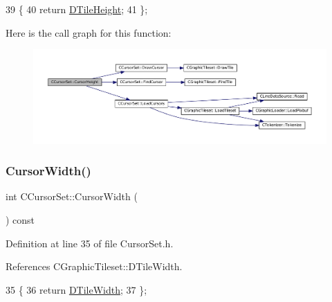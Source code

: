 \begin{DoxyCode}
39                                 \{
40             \textcolor{keywordflow}{return} \hyperlink{classCGraphicTileset_af48f32e07d5fe69afd5f764318cc3244}{DTileHeight};
41         \};
\end{DoxyCode}
Here is the call graph for this function\+:\nopagebreak
\begin{figure}[H]
\begin{center}
\leavevmode
\includegraphics[width=350pt]{classCCursorSet_a25ce1f3e861c3d4ea701bb2e810728a6_cgraph}
\end{center}
\end{figure}
\hypertarget{classCCursorSet_a6984a5bfd8b989c09f9ab8aac459993e}{}\label{classCCursorSet_a6984a5bfd8b989c09f9ab8aac459993e} 
\subsubsection{\texorpdfstring{Cursor\+Width()}{CursorWidth()}}
{\footnotesize\ttfamily int C\+Cursor\+Set\+::\+Cursor\+Width (\begin{DoxyParamCaption}{ }\end{DoxyParamCaption}) const\hspace{0.3cm}{\ttfamily [inline]}}



Definition at line 35 of file Cursor\+Set.\+h.



References C\+Graphic\+Tileset\+::\+D\+Tile\+Width.


\begin{DoxyCode}
35                                \{
36             \textcolor{keywordflow}{return} \hyperlink{classCGraphicTileset_a2d0c7d19865b81911a3a43d5cae50e00}{DTileWidth};
37         \};
\end{DoxyCode}
\hypertarget{classCCursorSet_ab28cc2871e723b2509a5036eac1086ba}{}\label{classCCursorSet_ab28cc2871e723b2509a5036eac1086ba} 
